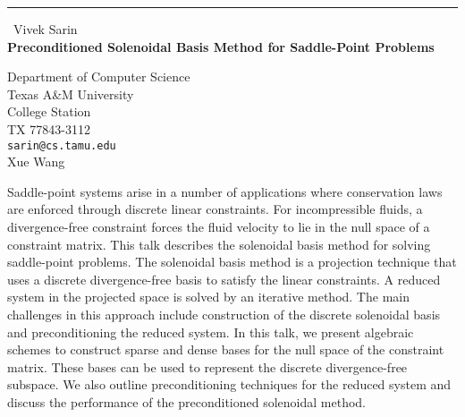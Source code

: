 \documentclass{report}
\begin{document}
\begin{center}
\rule{6in}{1pt} \
{\large Vivek Sarin \\
{\bf Preconditioned Solenoidal Basis Method for Saddle-Point Problems}}

Department of Computer Science \\ Texas A&M University \\ College Station \\ TX 77843-3112
\\
{\tt sarin@cs.tamu.edu}\\
Xue Wang\end{center}

Saddle-point systems arise in a number of applications where conservation
laws are enforced through discrete linear constraints. For incompressible
fluids, a divergence-free constraint forces the fluid velocity to lie in
the null space of a constraint matrix. This talk describes the solenoidal
basis method for solving saddle-point problems. The solenoidal basis
method is a projection technique that uses a discrete divergence-free
basis to satisfy the linear constraints. A reduced system in the
projected space is solved by an iterative method. The main challenges in
this approach include construction of the discrete solenoidal basis and
preconditioning the reduced system. In this talk, we present algebraic
schemes to construct sparse and dense bases for the null space of the
constraint matrix. These bases can be used to represent the discrete
divergence-free subspace. We also outline preconditioning techniques for
the reduced system and discuss the performance of the preconditioned
solenoidal method.
\end{document}
